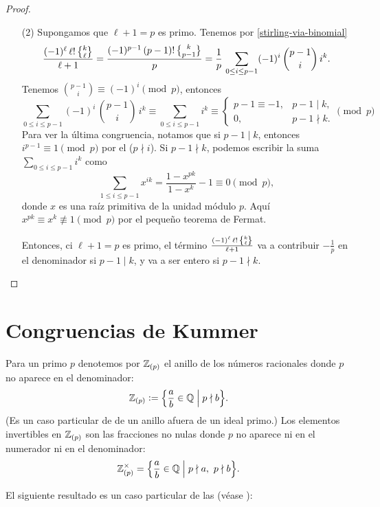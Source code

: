 \documentclass{article}
\numberwithin{equation}{section}
\theoremstyle{definition}
\begin{document}
\begin{proof}
\begin{itemize}
  \item[(2)] Supongamos que $\ell+1 = p$ es primo. Tenemos por
    \ref{stirling-via-binomial}
    $$\frac{(-1)^\ell \, \ell! \, \Stirling{k}{\ell}}{\ell+1} =
    \frac{(-1)^{p-1} \, (p-1)! \, \Stirling{k}{p-1}}{p} =
    \frac{1}{p}\,\sum_{0 \le i \le p-1} (-1)^i \, {p-1 \choose i} \, i^k.$$
    Tenemos ${p - 1 \choose i} \equiv (-1)^i \pmod{p}$, entonces
    \[ \sum_{0 \le i \le p-1} (-1)^i \, {p-1 \choose i} \, i^k \equiv \sum_{0 \le i \le p-1} i^k \equiv \begin{cases}
        p-1 \equiv -1, & p-1 \mid k,\\
        0, & p-1 \nmid k.
      \end{cases} \pmod{p} \]
    Para ver la última congruencia, notamos que si $p-1\mid k$, entonces
    $i^{p-1} \equiv 1 \pmod{p}$ por el 
    ($p\nmid i$). Si $p-1 \nmid k$, podemos escribir la suma
    $\sum_{0 \le i \le p-1} i^k$ como
    $$\sum_{1 \le i \le p-1} x^{ik} = \frac{1-x^{pk}}{1-x^k} - 1 \equiv 0 \pmod{p},$$
    donde $x$ es una raíz primitiva de la unidad módulo $p$. Aquí
    $x^{pk} \equiv x^k \not\equiv 1 \pmod{p}$ por el pequeño teorema de Fermat.

    Entonces, ci $\ell+1 = p$ es primo, el término
    $\frac{(-1)^\ell \, \ell! \, \Stirling{k}{\ell}}{\ell+1}$ va a contribuir
    $-\frac{1}{p}$ en el denominador si $p-1 \mid k$, y va a ser entero si
    $p-1 \nmid k$. \qedhere
  \end{itemize}
\end{proof}


\section{Congruencias de Kummer}

Para un primo $p$ denotemos por $\mathbb{Z}_{(p)}$ el anillo de los números racionales
donde $p$ no aparece en el denominador:
$$\mathbb{Z}_{(p)} \mathrel{\mathop:}= \Bigl\{ \frac{a}{b} \in \mathbb{Q} \Bigm| p\nmid b \Bigr\}.$$
(Es un caso particular de  de un anillo afuera de un ideal
primo.) Los elementos invertibles en $\mathbb{Z}_{(p)}$ son las fracciones no nulas
donde $p$ no aparece ni en el numerador ni en el denominador:
$$\mathbb{Z}_{(p)}^\times = \Bigl\{ \frac{a}{b} \in \mathbb{Q} \Bigm| p\nmid a, ~ p\nmid b \Bigr\}.$$

El siguiente resultado es un caso particular de las
(véase \cite[\S 11.3]{Arakawa-Ibukiyama-Kaneko-2014}):
\end{document}

